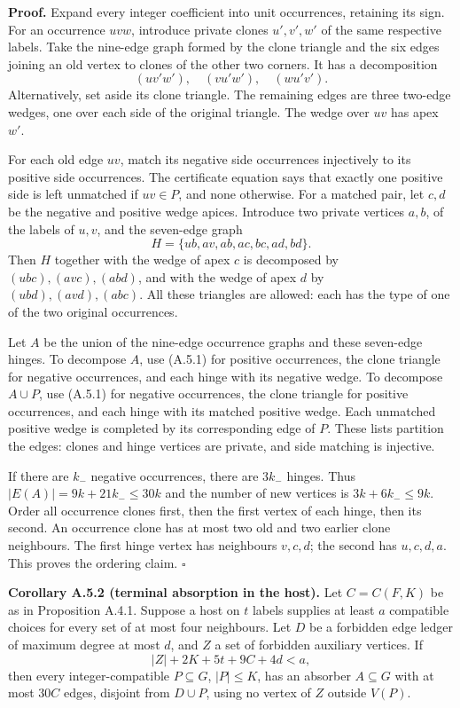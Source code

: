 \documentclass[english,11pt,a4paper]{article}
\newcounter{none}
\begin{document}
\textbf{Proof.} Expand every integer coefficient into unit occurrences, retaining its sign. For an occurrence \(uvw\), introduce private clones \(u',v',w'\) of the same respective labels. Take the nine-edge graph formed by the clone triangle and the six edges joining an old vertex to clones of the other two corners. It has a decomposition \[(u v'w'),\quad(v u'w'),\quad(w u'v').
\tag{A.5.1}\] Alternatively, set aside its clone triangle. The remaining edges are three two-edge wedges, one over each side of the original triangle. The wedge over \(uv\) has apex \(w'\).

For each old edge \(uv\), match its negative side occurrences injectively to its positive side occurrences. The certificate equation says that exactly one positive side is left unmatched if \(uv\in P\), and none otherwise. For a matched pair, let \(c,d\) be the negative and positive wedge apices. Introduce two private vertices \(a,b\), of the labels of \(u,v\), and the seven-edge graph \[H=\{ub,av,ab,ac,bc,ad,bd\}.\] Then \(H\) together with the wedge of apex \(c\) is decomposed by \((ubc),(avc),(abd)\), and with the wedge of apex \(d\) by \((ubd),(avd),(abc)\). All these triangles are allowed: each has the type of one of the two original occurrences.

Let \(A\) be the union of the nine-edge occurrence graphs and these seven-edge hinges. To decompose \(A\), use (A.5.1) for positive occurrences, the clone triangle for negative occurrences, and each hinge with its negative wedge. To decompose \(A\cup P\), use (A.5.1) for negative occurrences, the clone triangle for positive occurrences, and each hinge with its matched positive wedge. Each unmatched positive wedge is completed by its corresponding edge of \(P\). These lists partition the edges: clones and hinge vertices are private, and side matching is injective.

If there are \(k_-\) negative occurrences, there are \(3k_-\) hinges. Thus \(|E(A)|=9k+21k_-\le30k\) and the number of new vertices is \(3k+6k_-\le9k\). Order all occurrence clones first, then the first vertex of each hinge, then its second. An occurrence clone has at most two old and two earlier clone neighbours. The first hinge vertex has neighbours \(v,c,d\); the second has \(u,c,d,a\). This proves the ordering claim. \(\square\)

\textbf{Corollary A.5.2 (terminal absorption in the host).} Let \(C=C(F,K)\) be as in Proposition A.4.1. Suppose a host on \(t\) labels supplies at least \(a\) compatible choices for every set of at most four neighbours. Let \(D\) be a forbidden edge ledger of maximum degree at most \(d\), and \(Z\) a set of forbidden auxiliary vertices. If \[|Z|+2K+5t+9C+4d<a,
\tag{A.5.2}\] then every integer-compatible \(P\subseteq G\), \(|P|\le K\), has an absorber \(A\subseteq G\) with at most \(30C\) edges, disjoint from \(D\cup P\), using no vertex of \(Z\) outside \(V(P)\).
\end{document}
